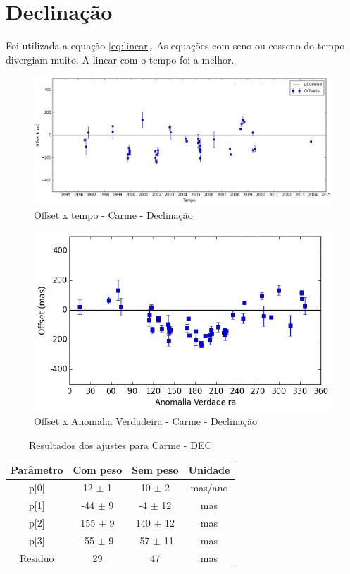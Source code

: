 \documentclass[11pt,a4paper]{report}
\begin{document}
\section*{Declinação}

Foi utilizada a equação \ref{eq:linear}. As equações com seno ou cosseno do tempo divergiam muito. A linear com o tempo foi a melhor.

\begin{figure}[h]
\caption{Offset x tempo - Carme - Declinação}
\includegraphics[scale=0.45]{Carme/DEC.png} 
\end{figure}

\begin{figure}[h]
\caption{Offset x Anomalia Verdadeira - Carme - Declinação}
\includegraphics[scale=0.45]{Carme/DEC_anom.png}  
\end{figure}

\begin{table}[h!]
\caption{\label{Tab: Carme-DEC} Resultados dos ajustes para Carme - DEC}
\begin{centering}
\begin{tabular}{cccc}
\hline
\hline
Parâmetro & Com peso & Sem peso & Unidade\tabularnewline
\hline
p[0] & 12 $\pm$ 1 & 10 $\pm$ 2 & mas/ano\\
p[1] & -44 $\pm$ 9 & -4 $\pm$ 12 & mas\\
p[2] & 155 $\pm$ 9 & 140 $\pm$ 12 & mas\\
p[3] & -55 $\pm$ 9 & -57 $\pm$ 11 & mas\\
Residuo & 29 & 47 & mas\\
\hline 
\end{tabular} 
\par\end{centering}
\end{table}
\end{document}
